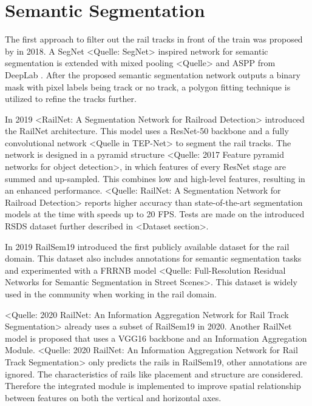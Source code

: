 \section{Semantic Segmentation}
\label{sec:SemanticSegmentation}

The first approach to filter out the rail tracks in front of the train was proposed by \cite{firstRailSegmentation2018} in 2018.
A SegNet \cite{SegNet2017} <Quelle: SegNet> inspired network for semantic segmentation is extended with mixed pooling \cite{mixedPooling2014} <Quelle> and \ac{ASPP} from DeepLab \cite{deepLab2018}.
After the proposed semantic segmentation network outputs a binary mask with pixel labels being track or no track, a polygon fitting technique is utilized to refine the tracks further.

In 2019 \cite{railNet2019} <RailNet: A Segmentation Network for Railroad Detection> introduced the RailNet architecture.
This model uses a ResNet-50 \cite{ResNet} backbone and a fully convolutional network <Quelle in TEP-Net> to segment the rail tracks.
The network is designed in a pyramid structure <Quelle: 2017 Feature pyramid networks for object detection>, in which features of every ResNet stage are summed and up-sampled.
This combines low and high-level features, resulting in an enhanced performance.
\cite{railNet2019} <Quelle: RailNet: A Segmentation Network for Railroad Detection> reports higher accuracy than state-of-the-art segmentation models at the time with speeds up to 20 \ac{FPS}.
Tests are made on the introduced \ac{RSDS} dataset further described in <Dataset section>.

In 2019 RailSem19 \cite{railsem19dataset} introduced the first publicly available dataset for the rail domain.
This dataset also includes annotations for semantic segmentation tasks and experimented with a FRRNB model <Quelle: Full-Resolution Residual Networks for Semantic Segmentation in Street Scenes>.
This dataset is widely used in the community when working in the rail domain.

<Quelle: 2020 RailNet: An Information Aggregation Network for Rail Track Segmentation> already uses a subset of RailSem19 in 2020.
Another RailNet model is proposed that uses a VGG16 backbone and an Information Aggregation Module.
<Quelle: 2020 RailNet: An Information Aggregation Network for Rail Track Segmentation> only predicts the rails in RailSem19, other annotations are ignored.
The characteristics of rails like placement and structure are considered.
Therefore the integrated module is implemented to improve spatial relationship between features on both the vertical and horizontal axes.

